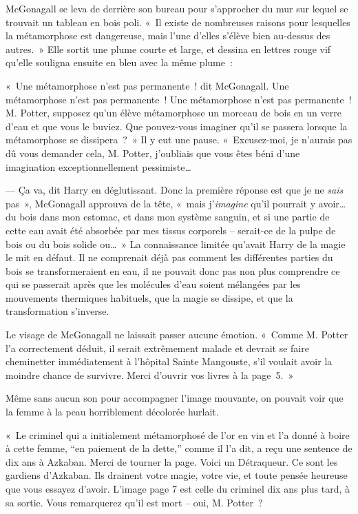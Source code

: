 McGonagall se leva de derrière son bureau pour s'approcher du mur sur lequel se trouvait un tableau en bois poli.
«~Il existe de nombreuses raisons pour lesquelles la métamorphose est dangereuse, mais l'une d'elles s'élève bien au-dessus des autres.~»
Elle sortit une plume courte et large, et dessina en lettres rouge vif qu'elle souligna ensuite en bleu avec la même plume~:


«~Une métamorphose n'est pas permanente~! dit McGonagall.
Une métamorphose n'est pas permanente~!
Une métamorphose n'est pas permanente~!
M. Potter, supposez qu'un élève métamorphose un morceau de bois en un verre d'eau et que vous le buviez.
Que pouvez-vous imaginer qu'il se passera lorsque la métamorphose se dissipera~?~»
Il y eut une pause.
«~Excusez-moi, je n'aurais pas dû vous demander cela, M. Potter, j'oubliais que vous êtes béni d'une imagination exceptionnellement pessimiste…

--- Ça va, dit Harry en déglutissant.
Donc la première réponse est que je ne \emph{sais} pas~», McGonagall approuva de la tête, «~mais j'\emph{imagine} qu'il pourrait y avoir… du bois dans mon estomac, et dans mon système sanguin, et si une partie de cette eau avait été absorbée par mes tissus corporels -- serait-ce de la pulpe de bois ou du bois solide ou…~»
La connaissance limitée qu'avait Harry de la magie le mit en défaut.
Il ne comprenait déjà pas comment les différentes parties du bois se transformeraient en eau,
il ne pouvait donc pas non plus comprendre ce qui se passerait après que les molécules d'eau soient mélangées par les mouvements thermiques habituels, que la magie se dissipe, et que la transformation s'inverse.

Le visage de McGonagall ne laissait passer aucune émotion.
«~Comme M. Potter l'a correctement déduit, il serait extrêmement malade et devrait se faire cheminetter immédiatement à l'hôpital Sainte Mangouste, s'il voulait avoir la moindre chance de survivre.
Merci d'ouvrir vos livres à la page~5.~»

Même sans aucun son pour accompagner l'image mouvante, on pouvait voir que la femme à la peau horriblement décolorée hurlait.

«~Le criminel qui a initialement métamorphosé de l'or en vin et l'a donné à boire à cette femme, “en paiement de la dette,” comme il l'a dit, a reçu une sentence de dix ans à Azkaban.
Merci de tourner la page.
Voici un Détraqueur.
Ce sont les gardiens d'Azkaban.
Ils drainent votre magie, votre vie, et toute pensée heureuse que vous essayez d'avoir.
L'image page 7 est celle du criminel dix ans plus tard, à sa sortie.
Vous remarquerez qu'il est mort -- oui, M. Potter~?

